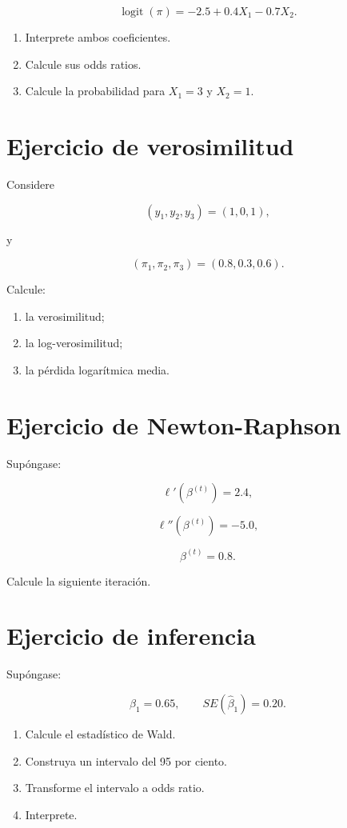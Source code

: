 \documentclass[
  spanish,
  11pt,
  letterpaper,
  DIV=11,
  numbers=noendperiod]{scrreprt}
\providecommand{\tightlist}{%
  \setlength{\itemsep}{0pt}\setlength{\parskip}{0pt}}
\theoremstyle{definition}
\theoremstyle{plain}
\theoremstyle{definition}
\theoremstyle{remark}
\begin{document}
\[
\operatorname{logit}(\pi)
=
-2.5+0.4X_1-0.7X_2.
\]

\begin{enumerate}
\def\labelenumi{\arabic{enumi}.}
\tightlist
\item
  Interprete ambos coeficientes.
\item
  Calcule sus odds ratios.
\item
  Calcule la probabilidad para \(X_1=3\) y \(X_2=1\).
\end{enumerate}

\section{Ejercicio de verosimilitud}\label{ejercicio-de-verosimilitud}

Considere

\[
(y_1,y_2,y_3)=(1,0,1),
\]

y

\[
(\pi_1,\pi_2,\pi_3)=(0.8,0.3,0.6).
\]

Calcule:

\begin{enumerate}
\def\labelenumi{\arabic{enumi}.}
\tightlist
\item
  la verosimilitud;
\item
  la log-verosimilitud;
\item
  la pérdida logarítmica media.
\end{enumerate}

\section{Ejercicio de Newton-Raphson}\label{ejercicio-de-newton-raphson}

Supóngase:

\[
\ell'(\beta^{(t)})=2.4,
\]

\[
\ell''(\beta^{(t)})=-5.0,
\]

\[
\beta^{(t)}=0.8.
\]

Calcule la siguiente iteración.

\section{Ejercicio de inferencia}\label{ejercicio-de-inferencia-1}

Supóngase:

\[
\widehat{\beta}_1=0.65,
\qquad
SE(\widehat{\beta}_1)=0.20.
\]

\begin{enumerate}
\def\labelenumi{\arabic{enumi}.}
\tightlist
\item
  Calcule el estadístico de Wald.
\item
  Construya un intervalo del 95 por ciento.
\item
  Transforme el intervalo a odds ratio.
\item
  Interprete.
\end{enumerate}
\end{document}
